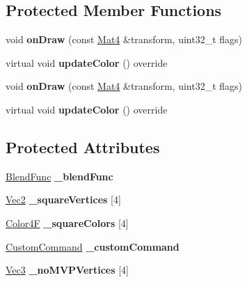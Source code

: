 \subsection*{Protected Member Functions}
\begin{DoxyCompactItemize}
\item 
\mbox{\label{classLayerColor_ad31f67302be1f0ef8f78e3c6c3264460}} 
void {\bfseries on\+Draw} (const \hyperlink{classMat4}{Mat4} \&transform, uint32\+\_\+t flags)
\item 
\mbox{\label{classLayerColor_a118bf5cabc0f5885698ea25b9e75e032}} 
virtual void {\bfseries update\+Color} () override
\item 
\mbox{\label{classLayerColor_ad31f67302be1f0ef8f78e3c6c3264460}} 
void {\bfseries on\+Draw} (const \hyperlink{classMat4}{Mat4} \&transform, uint32\+\_\+t flags)
\item 
\mbox{\label{classLayerColor_a7bd2b91e2f17caa54db6f59ea8aa6087}} 
virtual void {\bfseries update\+Color} () override
\end{DoxyCompactItemize}
\subsection*{Protected Attributes}
\begin{DoxyCompactItemize}
\item 
\mbox{\label{classLayerColor_ad61802d57e92c41cb92fc399130e3114}} 
\hyperlink{structBlendFunc}{Blend\+Func} {\bfseries \+\_\+blend\+Func}
\item 
\mbox{\label{classLayerColor_ac69e5c3a35e531c78a915d76363388fd}} 
\hyperlink{classVec2}{Vec2} {\bfseries \+\_\+square\+Vertices} \mbox{[}4\mbox{]}
\item 
\mbox{\label{classLayerColor_ac9b4aa76f3518307d55c57c225632938}} 
\hyperlink{structColor4F}{Color4F} {\bfseries \+\_\+square\+Colors} \mbox{[}4\mbox{]}
\item 
\mbox{\label{classLayerColor_a7f0879ee06c7917b7f5d35cfb4a514ff}} 
\hyperlink{classCustomCommand}{Custom\+Command} {\bfseries \+\_\+custom\+Command}
\item 
\mbox{\label{classLayerColor_ab0ce18f0713242e70bfc5515ca8a59cc}} 
\hyperlink{classVec3}{Vec3} {\bfseries \+\_\+no\+M\+V\+P\+Vertices} \mbox{[}4\mbox{]}
\end{DoxyCompactItemize}
